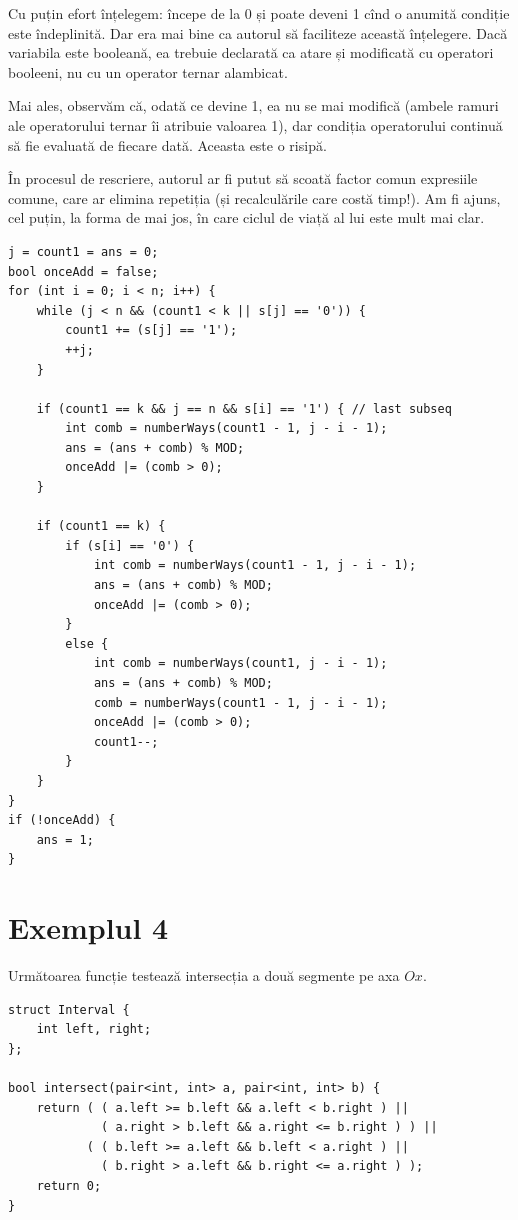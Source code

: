 \documentclass[../main.tex]{subfiles}
\begin{document}
Cu puțin efort înțelegem:  începe de la 0 și poate deveni 1 cînd o anumită condiție este îndeplinită. Dar era mai bine ca autorul să faciliteze această înțelegere. Dacă variabila este booleană, ea trebuie declarată ca atare și modificată cu operatori booleeni, nu cu un operator ternar alambicat.

Mai ales, observăm că, odată ce  devine 1, ea nu se mai modifică (ambele ramuri ale operatorului ternar  îi atribuie valoarea 1), dar condiția operatorului continuă să fie evaluată de fiecare dată. Aceasta este o risipă.

În procesul de rescriere, autorul ar fi putut să scoată factor comun expresiile comune, care ar elimina repetiția (și recalculările care costă timp!). Am fi ajuns, cel puțin, la forma de mai jos, în care ciclul de viață al lui  este mult mai clar.

\begin{verbatim}
j = count1 = ans = 0;
bool onceAdd = false;
for (int i = 0; i < n; i++) {
    while (j < n && (count1 < k || s[j] == '0')) {
        count1 += (s[j] == '1');
        ++j;
    }

    if (count1 == k && j == n && s[i] == '1') { // last subseq
        int comb = numberWays(count1 - 1, j - i - 1);
        ans = (ans + comb) % MOD;
        onceAdd |= (comb > 0);
    }

    if (count1 == k) {
        if (s[i] == '0') {
            int comb = numberWays(count1 - 1, j - i - 1);
            ans = (ans + comb) % MOD;
            onceAdd |= (comb > 0);
        }
        else {
            int comb = numberWays(count1, j - i - 1);
            ans = (ans + comb) % MOD;
            comb = numberWays(count1 - 1, j - i - 1);
            onceAdd |= (comb > 0);
            count1--;
        }
    }
}
if (!onceAdd) {
    ans = 1;
}
\end{verbatim}


\section{Exemplul 4}

Următoarea funcție testează intersecția a două segmente pe axa $Ox$.

\begin{verbatim}
struct Interval {
    int left, right;
};

bool intersect(pair<int, int> a, pair<int, int> b) {
    return ( ( a.left >= b.left && a.left < b.right ) ||
             ( a.right > b.left && a.right <= b.right ) ) ||
           ( ( b.left >= a.left && b.left < a.right ) ||
             ( b.right > a.left && b.right <= a.right ) );
    return 0;
}
\end{verbatim}
\end{document}
